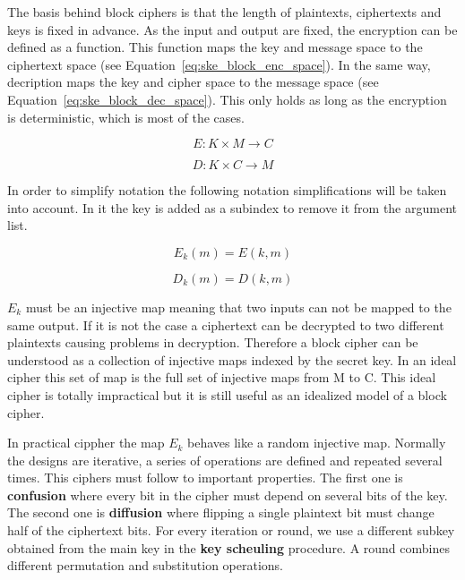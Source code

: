 The basis behind block ciphers is that the length of plaintexts, ciphertexts and keys is fixed in advance.
As the input and output are fixed, the encryption can be defined as a function.
This function maps the key and message space to the ciphertext space (see Equation~\ref{eq:ske_block_enc_space}).
In the same way, decription maps the key and cipher space to the message space (see Equation~\ref{eq:ske_block_dec_space}).
This only holds as long as the encryption is deterministic, which is most of the cases.

\begin{equation}
  E:K \times M \rightarrow C
\label{eq:ske_block_enc_space}
\end{equation}

\begin{equation}
  D:K \times C \rightarrow M
\label{eq:ske_block_dec_space}
\end{equation}

In order to simplify notation the following notation simplifications will be taken into account.
In it the key is added as a subindex to remove it from the argument list.

\begin{equation*}
  E_k(m)=E(k, m)
\end{equation*}

\begin{equation*}
  D_k(m)=D(k, m)
\end{equation*}

$E_k$ must be an injective map meaning that two inputs can not be mapped to the same output.
If it is not the case a ciphertext can be decrypted to two different plaintexts causing problems in decryption.
Therefore a block cipher can be understood as a collection of injective maps indexed by the secret key.
In an ideal cipher this set of map is the full set of injective maps from M to C.
This ideal cipher is totally impractical but it is still useful as an idealized model of a block cipher.

In practical cippher the map $E_k$ behaves like a random injective map.
Normally the designs are iterative, a series of operations are defined and repeated several times.
This ciphers must follow to important properties.
The first one is \textbf{confusion} where every bit in the cipher must depend on several bits of the key.
The second one is \textbf{diffusion} where flipping a single plaintext bit must change half of the ciphertext bits.
For every iteration or round, we use a different subkey obtained from the main key in the \textbf{key scheuling} procedure.
A round combines different permutation and substitution operations.


